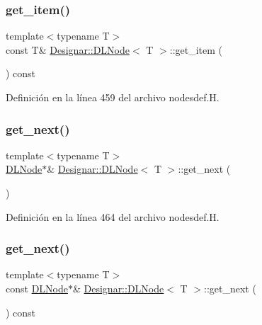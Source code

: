 \subsubsection{\texorpdfstring{get\+\_\+item()}{get\_item()}\hspace{0.1cm}{\footnotesize\ttfamily [2/2]}}
{\footnotesize\ttfamily template$<$typename T$>$ \\
const T\& \hyperlink{class_designar_1_1_d_l_node}{Designar\+::\+D\+L\+Node}$<$ T $>$\+::get\+\_\+item (\begin{DoxyParamCaption}{ }\end{DoxyParamCaption}) const\hspace{0.3cm}{\ttfamily [inline]}}



Definición en la línea 459 del archivo nodesdef.\+H.

\mbox{\label{class_designar_1_1_d_l_node_a28ad2b7a46044b5e798e06888631bbde}} 
\subsubsection{\texorpdfstring{get\+\_\+next()}{get\_next()}\hspace{0.1cm}{\footnotesize\ttfamily [1/2]}}
{\footnotesize\ttfamily template$<$typename T$>$ \\
\hyperlink{class_designar_1_1_d_l_node}{D\+L\+Node}$\ast$\& \hyperlink{class_designar_1_1_d_l_node}{Designar\+::\+D\+L\+Node}$<$ T $>$\+::get\+\_\+next (\begin{DoxyParamCaption}{ }\end{DoxyParamCaption})\hspace{0.3cm}{\ttfamily [inline]}}



Definición en la línea 464 del archivo nodesdef.\+H.

\mbox{\label{class_designar_1_1_d_l_node_a2e9212d8d5bec7b811c8ca11948bdad6}} 
\subsubsection{\texorpdfstring{get\+\_\+next()}{get\_next()}\hspace{0.1cm}{\footnotesize\ttfamily [2/2]}}
{\footnotesize\ttfamily template$<$typename T$>$ \\
const \hyperlink{class_designar_1_1_d_l_node}{D\+L\+Node}$\ast$\& \hyperlink{class_designar_1_1_d_l_node}{Designar\+::\+D\+L\+Node}$<$ T $>$\+::get\+\_\+next (\begin{DoxyParamCaption}{ }\end{DoxyParamCaption}) const\hspace{0.3cm}{\ttfamily [inline]}}



